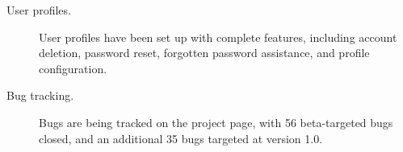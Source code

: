 \begin{description}
    \item[User profiles.] User profiles have been set up with complete features, including account deletion, password reset, forgotten password assistance, and profile configuration.
    \item[Bug tracking.] Bugs are being tracked on the project page, with 56 beta-targeted bugs closed, and an additional 35 bugs targeted at version 1.0.
\end{description}
